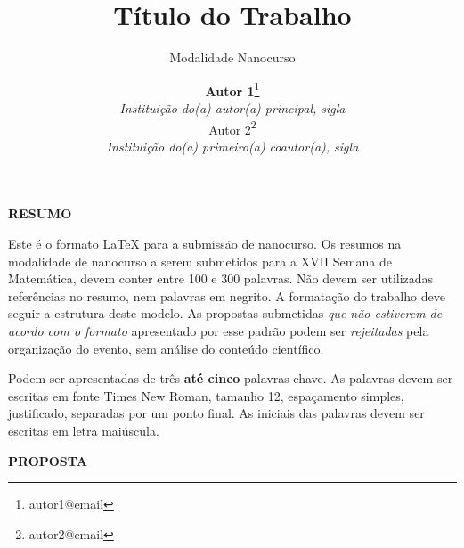 \documentclass{semat}
\begin{document}

\title{\textbf{Título do Trabalho}}
\subtitle{Modalidade Nanocurso} %

\author{
    {\large \textbf {Autor 1}}\thanks{autor1@email}\\ 
    {\small \textit{Instituição do(a) autor(a) principal, sigla}} \\
    {\large Autor 2}\thanks{autor2@email}\\
    {\small \textit{Instituição do(a) primeiro(a) coautor(a), sigla}} 
}
\criartitulo

\begin{center}
\textbf{RESUMO}
\end{center}
\noindent Este é o formato \LaTeX{} para a submissão de nanocurso. Os resumos na modalidade de nanocurso a serem submetidos para a XVII Semana de Matemática, devem conter entre 100 e 300 palavras. Não devem ser utilizadas referências no resumo, nem palavras em negrito. A formatação do trabalho deve seguir a estrutura deste modelo. As propostas submetidas \emph{que não estiverem de acordo com o formato} apresentado por esse padrão podem ser \emph{rejeitadas} pela organização do evento, sem análise do conteúdo científico.
\vspace{1.5em}

 Podem ser apresentadas de três \textbf{até cinco} palavras-chave. As palavras devem ser escritas em fonte Times New Roman, tamanho 12, espaçamento simples, justificado, separadas por um ponto final. As iniciais das palavras devem ser escritas em letra maiúscula.
\vspace{1.5em}


\vspace{1.5em}
\begin{center}
\textbf{PROPOSTA}
\end{center}
\end{document}
